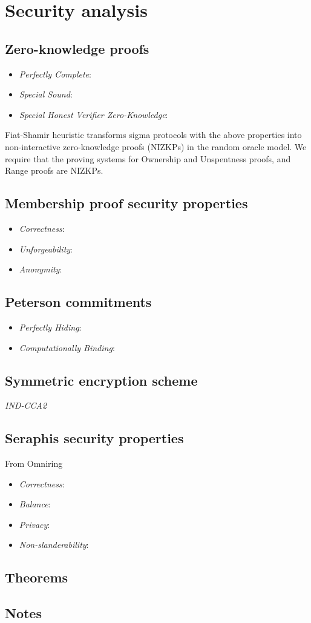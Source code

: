 \documentclass{article}
\begin{document}
\section{Security analysis}
\subsection{Zero-knowledge proofs}
\begin{itemize}
    \item \textit{Perfectly Complete}:
    \item \textit{Special Sound}:
    \item \textit{Special Honest Verifier Zero-Knowledge}:
\end{itemize}
Fiat-Shamir heuristic \cite{fiat-shamir} transforms sigma protocols with the above properties into non-interactive zero-knowledge proofs (NIZKPs) in the random oracle model. We require that the proving systems for Ownership and Unspentness proofs, and Range proofs are NIZKPs.
\subsection{Membership proof security properties}
\begin{itemize}
    \item \textit{Correctness}:
    \item \textit{Unforgeability}:
    \item \textit{Anonymity}:
\end{itemize}
\subsection{Peterson commitments}
\begin{itemize}
    \item \textit{Perfectly Hiding}:
    \item \textit{Computationally Binding}:
\end{itemize}
\subsection{Symmetric encryption scheme}
\noindent \textit{IND-CCA2}
\subsection{Seraphis security properties}
\noindent From Omniring
\begin{itemize}
    \item \textit{Correctness}:
    \item \textit{Balance}:
    \item \textit{Privacy}:
    \item \textit{Non-slanderability}:
\end{itemize}
\subsection{Theorems}
\subsection{Notes}\label{sec-notes}



\end{document}
